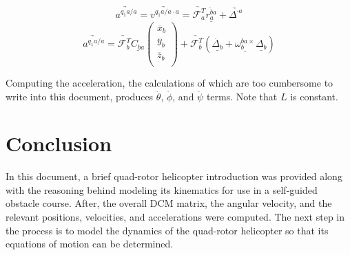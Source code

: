 \documentclass[journal]{IEEEtran}
\begin{document}
\begin{equation}
	\underrightarrow{a^{q_1a/a}}=\underrightarrow{v^{q_1a/a\cdot{a}}}=\underrightarrow{\mathcal{F}^T_a}\underline{\ddot{r^{ba}_a}}+\underrightarrow{\Delta^{\cdot{a}}}
	\label{eq:acc1}
\end{equation}
\begin{equation}
	\underrightarrow{a^{q_1a/a}}=\underrightarrow{\mathcal{F}^T_b}\underline{C_{ba}}\left( \begin{array}{c}
				\ddot{x_b} \\
				\ddot{y_b} \\
				\ddot{z_b} \\
				\end{array} \right)+\underrightarrow{\mathcal{F}^T_b}(\underline{\dot{\Delta_b}}+\underline{\omega^{ba\times}_b}\underline{\Delta_b})
	\label{eq:acc2}
\end{equation}

Computing the acceleration, the calculations of which are too cumbersome to write into this document, produces $\ddot{\theta}$, $\ddot{\phi}$, and $\ddot{\psi}$ terms. Note that $L$ is constant.

\section{Conclusion}
In this document, a brief quad-rotor helicopter introduction was provided along with the reasoning behind modeling its kinematics for use in a self-guided obstacle course. After, the overall DCM matrix, the angular velocity, and the relevant positions, velocities, and accelerations were computed. The next step in the process is to model the dynamics of the quad-rotor helicopter so that its equations of motion can be determined. 



\end{document}
